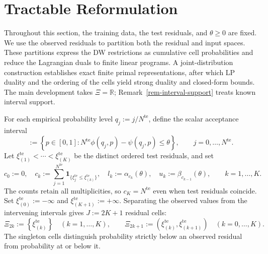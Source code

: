 \section{Tractable Reformulation}
\label{sec-reformulation}

Throughout this section, the training data, the test residuals, and $\theta\ge0$ are fixed. We use the observed residuals to partition both the residual and input spaces. These partitions express the DW restrictions as cumulative cell probabilities and reduce the Lagrangian duals to finite linear programs. A joint-distribution construction establishes exact finite primal representations, after which LP duality and the ordering of the cells yield strong duality and closed-form bounds. The main development takes $\Xi=\mathbb R$; Remark~\ref{rem-interval-support} treats known interval support.

For each empirical probability level $q_j:=j/N^{\mathrm{te}}$, define the scalar acceptance interval
\begin{equation}
  [\alpha_j(\theta),\beta_j(\theta)]
  :=\left\{p\in[0,1]:
  N^{\mathrm{te}}\phi(q_j,p)-\psi(q_j,p)\le\theta\right\},
  \qquad j=0,\ldots,N^{\mathrm{te}}.
  \label{eq-dw-rank-acceptance}
\end{equation}
Let $\xi_{(1)}^{\mathrm{te}}<\cdots<\xi_{(K)}^{\mathrm{te}}$ be the distinct ordered test residuals, and set
\begin{equation}
  c_0:=0,\quad
  c_k:=\sum_{j=1}^{N^{\mathrm{te}}}\mathbf1_{\{\xi_j^{\mathrm{te}}\le\xi_{(k)}^{\mathrm{te}}\}},\quad
  l_k:=\alpha_{c_k}(\theta),\quad
  u_k:=\beta_{c_{k-1}}(\theta),\qquad k=1,\ldots,K.
  \label{eq-dw-counts-and-levels}
\end{equation}
The counts retain all multiplicities, so $c_K=N^{\mathrm{te}}$ even when test residuals coincide. Set $\xi_{(0)}^{\mathrm{te}}:=-\infty$ and $\xi_{(K+1)}^{\mathrm{te}}:=+\infty$. Separating the observed values from the intervening intervals gives $J:=2K+1$ residual cells:
\begin{equation}
  \Xi_{2k}:=\left\{\xi_{(k)}^{\mathrm{te}}\right\}
    \quad\left(k=1,\ldots,K\right),
  \qquad
  \Xi_{2k+1}:=\left(\xi_{(k)}^{\mathrm{te}},\xi_{(k+1)}^{\mathrm{te}}\right)
    \quad\left(k=0,\ldots,K\right).
  \label{eq-residual-cells}
\end{equation}
The singleton cells distinguish probability strictly below an observed residual from probability at or below it.

